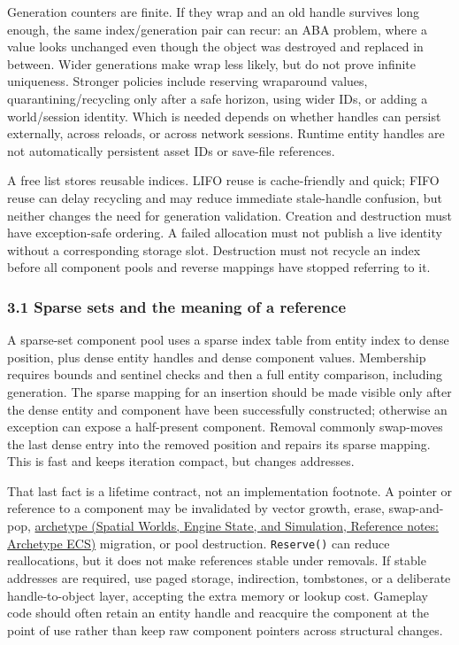 Generation counters are finite. If they wrap and an old handle survives long enough, the same index/generation pair can recur: an ABA problem, where a value looks unchanged even though the object was destroyed and replaced in between. Wider generations make wrap less likely, but do not prove infinite uniqueness. Stronger policies include reserving wraparound values, quarantining/recycling only after a safe horizon, using wider IDs, or adding a world/session identity. Which is needed depends on whether handles can persist externally, across reloads, or across network sessions. Runtime entity handles are not automatically persistent asset IDs or save-file references.

A free list stores reusable indices. LIFO reuse is cache-friendly and quick; FIFO reuse can delay recycling and may reduce immediate stale-handle confusion, but neither changes the need for generation validation. Creation and destruction must have exception-safe ordering. A failed allocation must not publish a live identity without a corresponding storage slot. Destruction must not recycle an index before all component pools and reverse mappings have stopped referring to it.

\subsubsection{3.1 Sparse sets and the meaning of a reference}\label{05-engine-i-ch008-sparse-sets-and-the-meaning-of-a-reference}

A sparse-set component pool uses a sparse index table from entity index to dense position, plus dense entity handles and dense component values. Membership requires bounds and sentinel checks and then a full entity comparison, including generation. The sparse mapping for an insertion should be made visible only after the dense entity and component have been successfully constructed; otherwise an exception can expose a half-present component. Removal commonly swap-moves the last dense entry into the removed position and repairs its sparse mapping. This is fast and keeps iteration compact, but changes addresses.

That last fact is a lifetime contract, not an implementation footnote. A pointer or reference to a component may be invalidated by vector growth, erase, swap-and-pop, \href{../05-Spatial-Worlds-Engine-State-and-Simulation/main.pdf\#nameddest=appendix-fbfeb0430008}{archetype (Spatial Worlds, Engine State, and Simulation, Reference notes: Archetype ECS)} migration, or pool destruction. \texttt{Reserve()} can reduce reallocations, but it does not make references stable under removals. If stable addresses are required, use paged storage, indirection, tombstones, or a deliberate handle-to-object layer, accepting the extra memory or lookup cost. Gameplay code should often retain an entity handle and reacquire the component at the point of use rather than keep raw component pointers across structural changes.

